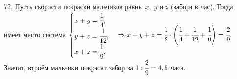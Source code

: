 72. Пусть скорости покраски мальчиков равны $x,\ y$ и $z$ (забора в час). Тогда имеет место система $\begin{cases} x+y=\cfrac{1}{4},\\ y+z=\cfrac{1}{12},\\ x+z=\cfrac{1}{9}.\end{cases}\Rightarrow x+y+z=\cfrac{1}{2}\cdot\left(\cfrac{1}{4}+\cfrac{1}{12}+\cfrac{1}{9}\right)=\cfrac{2}{9}.$ Значит, втроём мальчики покрасят забор за $1:\cfrac{2}{9}=4,5$ часа.\\
